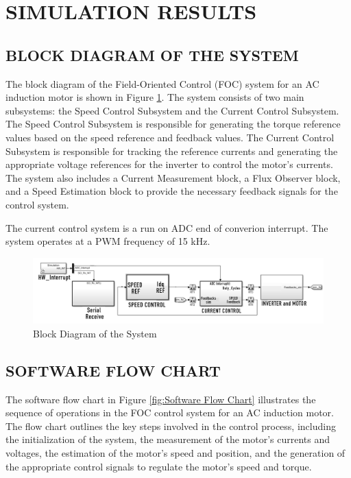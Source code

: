 \section{SIMULATION RESULTS}

\subsection{BLOCK DIAGRAM OF THE SYSTEM}



The block diagram of the Field-Oriented Control (FOC) system for an AC induction motor is shown in Figure \ref{fig:block_diagram}. The system consists of two main subsystems: the Speed Control Subsystem and the Current Control Subsystem. The Speed Control Subsystem is responsible for generating the torque reference values based on the speed reference and feedback values. The Current Control Subsystem is responsible for tracking the reference currents and generating the appropriate voltage references for the inverter to control the motor's currents. The system also includes a Current Measurement block, a Flux Observer block, and a Speed Estimation block to provide the necessary feedback signals for the control system.


The current control system is a run on ADC end of converion interrupt. The system operates at a PWM frequency of 15 kHz.

\begin{figure}[H]
	\centering
	\includegraphics[width=7in]{sections/section3/images/simulation/blockDia.png}
	\caption{Block Diagram of the System}
	\label{fig:block_diagram}
\end{figure}


\subsection{SOFTWARE FLOW CHART}
The software flow chart in Figure \ref{fig:Software Flow Chart} illustrates the sequence of operations in the FOC control system for an AC induction motor. The flow chart outlines the key steps involved in the control process, including the initialization of the system, the measurement of the motor's currents and voltages, the estimation of the motor's speed and position, and the generation of the appropriate control signals to regulate the motor's speed and torque.

